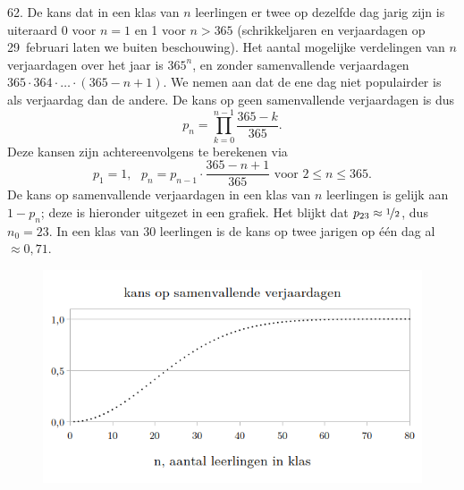 \clearpage

\begin{problem}{62.}
    De kans dat in een klas van $n$ leerlingen er twee op dezelfde dag jarig zijn is uiteraard 0 voor $n = 1$ en 1 voor $n > 365$ (schrikkeljaren en verjaardagen op 29~februari laten we buiten beschouwing). Het aantal mogelijke verdelingen van $n$ verjaardagen over het jaar is ${365}^n$, en zonder samenvallende verjaardagen $365 \cdot 364 \cdot \dots \cdot (365 - n + 1)$. We nemen aan dat de ene dag niet populairder is als verjaardag dan de andere. De kans op geen samenvallende verjaardagen is dus
    \begin{equation*}
        p_n = \textstyle\prod\limits_{k=0}^{n-1} \frac{365 - k}{365}.
    \end{equation*}
    Deze kansen zijn achtereenvolgens te berekenen via
    \begin{equation*}
        p_1 = 1, \text{ } p_n = p_{n-1} \cdot \frac{365 - n + 1}{365} \text{ voor } 2 \leq n \leq 365.
    \end{equation*}
    De kans op samenvallende verjaardagen in een klas van $n$ leerlingen is gelijk aan $1 - p_n$; deze is hieronder uitgezet in een grafiek. Het blijkt dat $p_{23} \approx \nicefrac{1}{2}$, dus $n_0 = 23$. In een klas van 30 leerlingen is de kans op twee jarigen op één dag al $\approx 0{,}71$.
    \begin{figure}
        \includegraphics[scale=0.35]{resources/oplossing62}
    \end{figure}
\end{problem}

\clearpage

